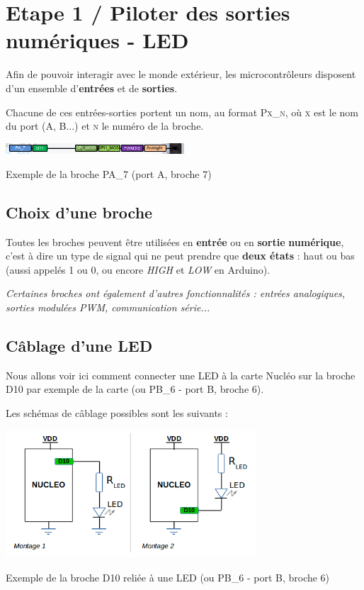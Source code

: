 \documentclass[a4paper,11pt,titlepage]{article} %
\begin{document}
\section{Etape 1 / Piloter des sorties numériques - LED}

Afin de pouvoir interagir avec le monde extérieur, les microcontrôleurs disposent d'un ensemble d'\textbf{entrées} et de \textbf{sorties}. 

Chacune de ces entrées-sorties portent un nom, au format \textsc{Px\_n}, où \textsc{x} est le nom du port (A, B...) et \textsc{n} le numéro de la broche.

\begin{center}
	\includegraphics[width=0.5\textwidth]{images/nucleo_pin_functions.png}
	
	Exemple de la broche PA\_7 (port A, broche 7)
\end{center}


\subsection{Choix d'une broche}

Toutes les broches peuvent être utilisées en \textbf{entrée} ou en \textbf{sortie} \textbf{numérique}, c'est à dire un type de signal qui ne peut prendre que \textbf{deux états} : haut ou bas (aussi appelés 1 ou 0, ou encore \textit{HIGH} et \textit{LOW} en Arduino). 

\textit{Certaines broches ont également d'autres fonctionnalités : entrées analogiques, sorties modulées PWM, communication série...}


\subsection{Câblage d'une LED}

Nous allons voir ici comment connecter une LED à la carte Nucléo sur la broche D10 par exemple de la carte (ou PB\_6 - port B, broche 6).

Les schémas de câblage possibles sont les suivants :

\begin{center}
	\includegraphics[width=0.7\textwidth]{images/MINE_Nucleo_LED_Connexion.png}
	
	Exemple de la broche D10 reliée à une LED (ou PB\_6 - port B, broche 6)
\end{center}
\end{document}
